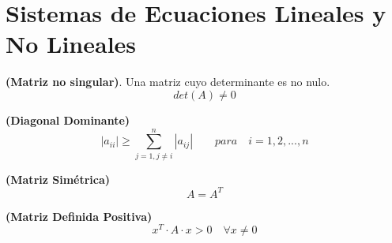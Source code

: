 \documentclass[../main.tex]{subfiles}
\begin{document}
\section{Sistemas de Ecuaciones Lineales y No Lineales} 

    \begin{definition} \textbf{(Matriz no singular)}.
        Una matriz cuyo determinante es no nulo.
        \begin{equation}
            det(A) \neq 0
        \end{equation}
    \end{definition}
        
    \begin{definition}\textbf{(Diagonal Dominante)}
        \begin{equation}
            |a_{ii}| \geq \sum_{j=1, j\neq i}^{n} |a_{ij}| \quad \quad para \quad i = 1,2,...,n
        \end{equation}
    \end{definition}

    \begin{definition}\textbf{(Matriz Simétrica)}
        \begin{equation}
            A = A^T
        \end{equation}
    \end{definition}

    \begin{definition}\textbf{(Matriz Definida Positiva)}
        \begin{equation}
            x^T \cdot A \cdot x > 0 \quad \forall x \neq 0
        \end{equation}
    \end{definition}
\end{document}
